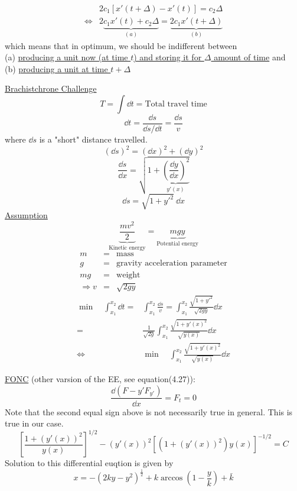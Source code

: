 \documentclass[twoside]{article}
\begin{document}
\begin{equation}
    \begin{aligned}
        &2c_1 [x'(t+ \Delta) - x'(t)] = c_2 \Delta\\[0.5em]
        \iff &2 \underbrace{c_1 x'(t)+ c_2 \Delta}_{(a)} = \underbrace{2c_1 x'(t+ \Delta)}_{(b)}
    \end{aligned}
\end{equation}
which means that in optimum, we should be indifferent between\\
(a) \underline{producing a unit now (at time $t$) and storing it for $\Delta$ amount of time} and\\
(b) \underline{producing a unit at time $t+\Delta$} 

\underline{Brachistchrone Challenge}
\[
    T = \int \dd t = \text{Total travel time}
\]
\[
    \dd t = \frac{\dd s}{\dd s / \dd t} = \frac{\dd s }{v}
\]
where $\dd s$ is a "short" distance travelled.
\[
    (\dd s) ^2 = (\dd x )^2 + (\dd y)^2
\]
\[
    \frac{\dd s}{\dd x} = \sqrt{1+\underbrace{(\frac{\dd y}{\dd x})^2}_{y'(x)}}
\]
\[
    \dd s = \sqrt{1+ {y'}^2} ~ \dd x
\]
\underline{Assumption}
\begin{equation}
    \underbrace{\frac{mv^2}{2}}_{\text{Kinetic energy}} = \underbrace{mgy}_{\text{Potential energy}} 
\end{equation}
\begin{eqnarray}
    m &=& \text{mass}\\
    g &=& \text{gravity acceleration parameter}\\
    mg &=& \text{weight}\\
    \Longrightarrow v &=& \sqrt{2gy}
\end{eqnarray}
\begin{equation}
\begin{aligned}
    \min \quad \int_{x_1}^{x_2} \dd t =& \int_{x_1}^{x_2} \frac{\dd s}{v} = \int_{x_1}^{x_2} \frac{\sqrt{1+{y'}^2}}{\sqrt{2gy}} \dd x \\
    =& \frac{1}{\sqrt{2g}}\int_{x_1}^{x_2} \frac{\sqrt{1+{y'(x)}^2}}{\sqrt{y(x)}} \dd x\\
    \iff & \min \quad \int_{x_1}^{x_2} \frac{\sqrt{1+{y'(x)}^2}}{\sqrt{y(x)}} \dd x
\end{aligned}
\end{equation}

\underline{FONC} (other varsion of the EE, see equation(4.27)):
\[
    \frac{\dd (F-y' F_{y'})}{\dd x} = F_t = 0
\]
Note that the second equal sign above is not necessarily true in general. This is true in our case.
\begin{equation}
    \left [ \frac{1+(y'(x))^2}{y(x)} \right]^{1/2} - (y'(x))^2\left [ ({1+(y'(x))^2})y(x) \right]^{-1/2}  = C
\end{equation}
Solution to this differential euqtion is given by
\begin{equation}
    x = - (2ky - y^2)^{\frac{1}{2}} + k \arccos (1 - \frac{y}{k}) + \bar{k}
\end{equation}
\end{document}
